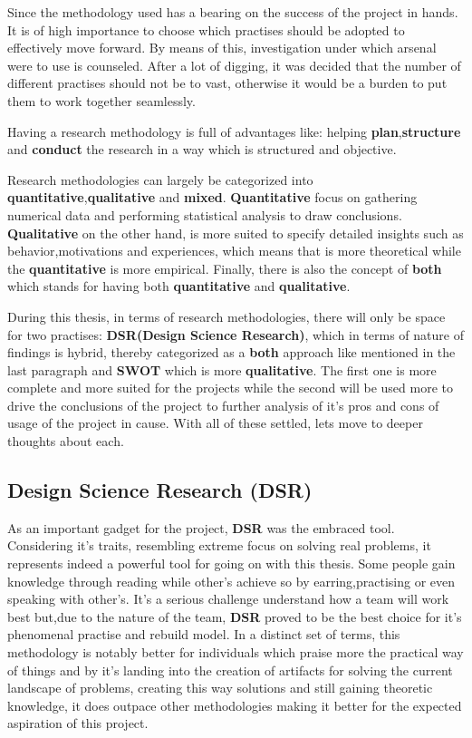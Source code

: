 Since the methodology used has a bearing on the success of the project in hands. It is of high importance to choose which practises should be adopted to effectively move forward. By means of this, investigation under which arsenal were to use is counseled. After a lot of digging, it was decided that the number of different practises should not be to vast, otherwise it would be a burden to put them to work together seamlessly. 

Having a research methodology is full of advantages like: helping \textbf{plan},\textbf{structure} and \textbf{conduct} the research in a way which is structured and objective. 

Research methodologies can largely be categorized into \textbf{quantitative},\textbf{qualitative} and \textbf{mixed}. \textbf{Quantitative} focus on gathering numerical data and performing statistical analysis to draw conclusions. \textbf{Qualitative} on the other hand, is more suited to specify detailed insights such as behavior,motivations and experiences, which means that is more theoretical while the \textbf{quantitative} is more empirical. Finally, there is also the concept of \textbf{both} which stands for having both \textbf{quantitative} and \textbf{qualitative}.

During this thesis, in terms of research methodologies, there will only be space for two practises:  \textbf{DSR(Design Science Research)}, which in terms of nature of findings is hybrid, thereby categorized as a \textbf{both} approach like mentioned in the last paragraph and \textbf{SWOT} which is more \textbf{qualitative}. The first one is more complete and more suited for the projects while the second will be used more to drive the conclusions of the project to further analysis of it's pros and cons of usage of the project in cause. With all of these settled, lets move to deeper thoughts about each.

%
%
%
%
\subsection{Design Science Research (DSR)}
As an important gadget for the project, \textbf{DSR}  was the embraced tool. Considering it's traits, resembling extreme focus on solving real problems, it represents indeed a powerful tool for going on with this thesis. Some people gain knowledge through reading while other's achieve so by earring,practising or even speaking with other's. It's a serious challenge understand how a team will work best but,due to the nature of the team, \textbf{DSR} proved to be the best choice for it's phenomenal practise and rebuild model. In a distinct set of terms, this methodology is notably better for individuals which praise more the practical way of things and by it's landing into the creation of artifacts for solving the current landscape of problems, creating this way solutions and still gaining theoretic knowledge, it does outpace other methodologies making it better for the expected aspiration of this project.


